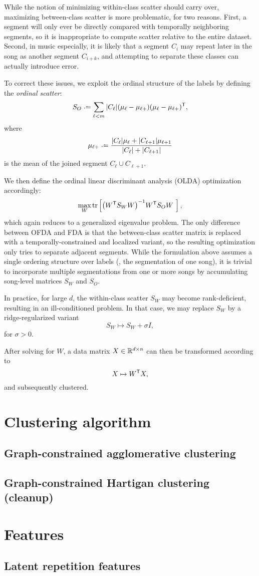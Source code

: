 \documentclass{article}
\begin{document}
While the notion of minimizing within-class scatter should carry over, maximizing between-class scatter is more problematic, for two reasons.
First, a segment will only ever be directly compared with temporally neighboring segments, so it is inappropriate to compute scatter relative to the entire dataset.
Second, in music especially, it is likely that a segment $C_i$ may repeat later in the song as another segment $C_{i+k}$, and attempting to separate these classes can actually
introduce error.

To correct these issues, we exploit the ordinal structure of the labels by defining the \emph{ordinal scatter}:
\[
S_O \defeq \sum_{\ell < m} |C_\ell| (\mu_\ell - \mu_{\ell+})(\mu_\ell - \mu_{\ell+})\trans,
\]
where
\[
\mu_{\ell+} \defeq \frac{|C_\ell|\mu_\ell + |C_{\ell+1}|\mu_{\ell+1}}{|C_\ell| + |C_{\ell+1}|}
\]
is the mean of the joined segment $C_\ell \cup C_{\ell+1}$.

We then define the ordinal linear discriminant analysis (OLDA) optimization accordingly:
\[
\max_W \trace\left[{\left(W\trans S_W W\right)}^{-1} W\trans S_O W\ \right],
\]
which again reduces to a generalized eigenvalue problem.  The only difference between OFDA and FDA is that the between-class scatter matrix is replaced with a temporally-constrained
and localized variant, so the resulting optimization only tries to separate adjacent segments.  While the formulation above assumes a single ordering structure over labels (\ie, the
segmentation of one song), it is trivial to incorporate multiple segmentations from one or more songs by accumulating song-level matrices $S_W$ and $S_O$.

In practice, for large $d$, the within-class scatter $S_W$ may become rank-deficient, resulting in an ill-conditioned problem.  In that case, we may replace $S_W$ by a
ridge-regularized variant
\[
S_W \mapsto S_W + \sigma I,
\]
for $\sigma > 0$.

After solving for $W$, a data matrix $X \in \mathbb{R}^{d \times n}$ can then be transformed according to
\[
X \mapsto W^\mathsf{T} X,
\]
and subsequently clustered.

\section{Clustering algorithm}

\subsection{Graph-constrained agglomerative clustering}
\subsection{Graph-constrained Hartigan clustering (cleanup)}

\section{Features}

\subsection{Latent repetition features}
\end{document}
